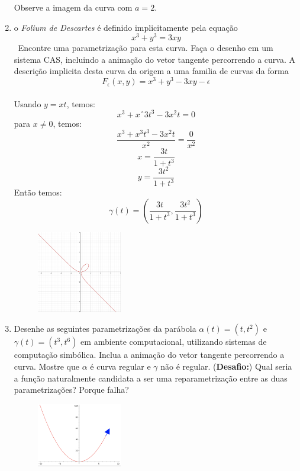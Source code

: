 \documentclass{article}
\begin{document}
\begin{enumerate}
\begin{figure}[!h]
                \label{fig:exercício 4}
            \end{figure} 
            Observe a imagem da curva com $a = 2$.
    \item o \textit{Folium de Descartes} é definido implicitamente pela equação \
        $$x^3+y^3 = 3xy$$ \
        Encontre uma parametrização para esta curva. Faça o desenho em um sistema CAS, incluindo a animação do vetor tangente percorrendo a curva. A descrição implicita desta curva da origem a uma familia de curvas da forma \
        $$F_{\epsilon}(x, y) = x^3 + y^3 - 3xy - \epsilon$$ \
        \\
        Usando $y = xt$, temos:
        $$x^3+xˆ3t^3-3x^2t = 0$$
        para $x \neq 0$, temos:
        $$\frac{x^3+x^3t^3-3x^2t}{x^2} = \frac{0}{x^2}$$
        $$x = \frac{3t}{1+t^3}$$
        $$y = \frac{3t^2}{1+t^3}$$
        Então temos:
        $$\gamma(t) = (\frac{3t}{1+t^3}, \frac{3t^2}{1+t^3})$$
        \begin{figure}[!h]
            \centering
            \includegraphics[width=0.35\textwidth]{folium_de_descartes.png}
            \label{fig:exercício 5}
        \end{figure}
    \item Desenhe as seguintes parametrizações da parábola $\alpha(t) = (t,t^2)$ e $\gamma(t) = (t^3,t^6)$ em ambiente computacional, utilizando sistemas de computação simbólica. Inclua a animação do vetor tangente percorrendo a curva. Mostre que $\alpha$ é curva regular e $\gamma$ não é regular. (\textbf{Desafio:}) Qual seria a função naturalmente candidata a ser uma reparametrização entre as duas parametrizações? Porque falha? \
        \begin{figure}[!h]
            \centering
            \includegraphics[width=0.35\textwidth]{curva2.png}

\end{figure}
\end{enumerate}
\end{document}

